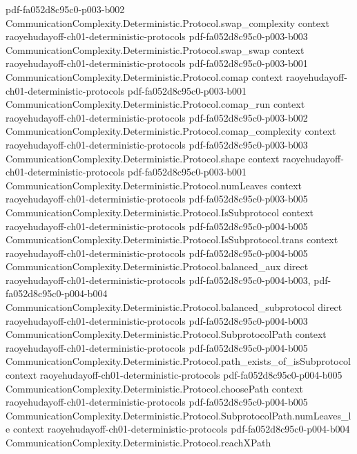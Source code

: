 \begin{theorem}
  {pdf-fa052d8c95c0-p003-b002}
\proofstep
  {CommunicationComplexity.Deterministic.Protocol.swap_complexity}
  {context}
  {raoyehudayoff-ch01-deterministic-protocols}
  {pdf-fa052d8c95c0-p003-b003}
\proofstep
  {CommunicationComplexity.Deterministic.Protocol.swap_swap}
  {context}
  {raoyehudayoff-ch01-deterministic-protocols}
  {pdf-fa052d8c95c0-p003-b001}
\proofstep
  {CommunicationComplexity.Deterministic.Protocol.comap}
  {context}
  {raoyehudayoff-ch01-deterministic-protocols}
  {pdf-fa052d8c95c0-p003-b001}
\proofstep
  {CommunicationComplexity.Deterministic.Protocol.comap_run}
  {context}
  {raoyehudayoff-ch01-deterministic-protocols}
  {pdf-fa052d8c95c0-p003-b002}
\proofstep
  {CommunicationComplexity.Deterministic.Protocol.comap_complexity}
  {context}
  {raoyehudayoff-ch01-deterministic-protocols}
  {pdf-fa052d8c95c0-p003-b003}
\proofstep
  {CommunicationComplexity.Deterministic.Protocol.shape}
  {context}
  {raoyehudayoff-ch01-deterministic-protocols}
  {pdf-fa052d8c95c0-p003-b001}
\proofstep
  {CommunicationComplexity.Deterministic.Protocol.numLeaves}
  {context}
  {raoyehudayoff-ch01-deterministic-protocols}
  {pdf-fa052d8c95c0-p003-b005}
\proofstep
  {CommunicationComplexity.Deterministic.Protocol.IsSubprotocol}
  {context}
  {raoyehudayoff-ch01-deterministic-protocols}
  {pdf-fa052d8c95c0-p004-b005}
\proofstep
  {CommunicationComplexity.Deterministic.Protocol.IsSubprotocol.trans}
  {context}
  {raoyehudayoff-ch01-deterministic-protocols}
  {pdf-fa052d8c95c0-p004-b005}
\proofstep
  {CommunicationComplexity.Deterministic.Protocol.balanced_aux}
  {direct}
  {raoyehudayoff-ch01-deterministic-protocols}
  {pdf-fa052d8c95c0-p004-b003,
    pdf-fa052d8c95c0-p004-b004}
\proofstep
  {CommunicationComplexity.Deterministic.Protocol.balanced_subprotocol}
  {direct}
  {raoyehudayoff-ch01-deterministic-protocols}
  {pdf-fa052d8c95c0-p004-b003}
\proofstep
  {CommunicationComplexity.Deterministic.Protocol.SubprotocolPath}
  {context}
  {raoyehudayoff-ch01-deterministic-protocols}
  {pdf-fa052d8c95c0-p004-b005}
\proofstep
  {CommunicationComplexity.Deterministic.Protocol.path_exists_of_isSubprotocol}
  {context}
  {raoyehudayoff-ch01-deterministic-protocols}
  {pdf-fa052d8c95c0-p004-b005}
\proofstep
  {CommunicationComplexity.Deterministic.Protocol.choosePath}
  {context}
  {raoyehudayoff-ch01-deterministic-protocols}
  {pdf-fa052d8c95c0-p004-b005}
\proofstep
  {CommunicationComplexity.Deterministic.Protocol.SubprotocolPath.numLeaves_le}
  {context}
  {raoyehudayoff-ch01-deterministic-protocols}
  {pdf-fa052d8c95c0-p004-b004}
\proofstep
  {CommunicationComplexity.Deterministic.Protocol.reachXPath}

\end{theorem}
